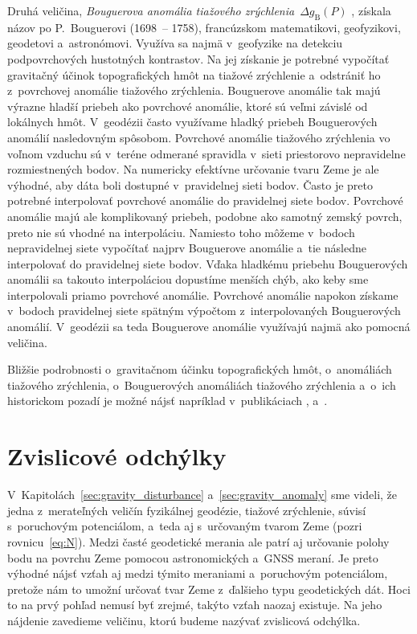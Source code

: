 \documentclass[a4paper, 12pt]{book}
\begin{document}
Druhá veličina, \emph{Bouguerova anomália tiažového zrýchlenia}~$\Delta 
g_{\mathrm{B}}(P)$ \parencite{MoritzPhysicalGeodesy}, získala názov po 
P.~Bouguerovi (1698~-- 1758), francúzskom matematikovi, geofyzikovi, geodetovi 
a~astronómovi.  Využíva sa najmä v~geofyzike na detekciu podpovrchových 
hustotných kontrastov.  Na jej získanie je potrebné vypočítať gravitačný účinok 
topografických hmôt na tiažové zrýchlenie a~odstrániť ho z~povrchovej anomálie 
tiažového zrýchlenia.  Bouguerove anomálie tak majú výrazne hladší priebeh ako 
povrchové anomálie, ktoré sú veľmi závislé od lokálnych hmôt.  V~geodézii často 
využívame hladký priebeh Bouguerových anomálií nasledovným spôsobom.  Povrchové 
anomálie tiažového zrýchlenia vo voľnom vzduchu sú v~teréne odmerané spravidla 
v~sieti priestorovo nepravidelne rozmiestnených bodov.  Na numericky efektívne 
určovanie tvaru Zeme je ale výhodné, aby dáta boli dostupné v~pravidelnej sieti 
bodov.  Často je preto potrebné interpolovať povrchové anomálie do pravidelnej 
siete bodov.  Povrchové anomálie majú ale komplikovaný priebeh, podobne ako 
samotný zemský povrch, preto nie sú vhodné na interpoláciu.  Namiesto toho 
môžeme v~bodoch nepravidelnej siete vypočítať najprv Bouguerove anomálie a~tie 
následne interpolovať do pravidelnej siete bodov.  Vďaka hladkému priebehu 
Bouguerových anomálii sa takouto interpoláciou dopustíme menších chýb, ako keby 
sme interpolovali priamo povrchové anomálie.  Povrchové anomálie napokon 
získame v~bodoch pravidelnej siete spätným výpočtom z~interpolovaných 
Bouguerových anomálií.  V~geodézii sa teda Bouguerove anomálie využívajú najmä 
ako pomocná veličina.

Bližšie podrobnosti o~gravitačnom účinku topografických hmôt, o~anomáliách 
tiažového zrýchlenia, o~Bouguerových anomáliách tiažového zrýchlenia a~o~ich 
historickom pozadí je možné nájsť napríklad v~publikáciach 
\textcite{Meurers2017}, \textcite{Mikuska2017} a~\textcite{Vajda2020}.





\section{Zvislicové odchýlky}
\label{sec:deflections}

V~Kapitolách~\ref{sec:gravity_disturbance} a~\ref{sec:gravity_anomaly} sme 
videli, že jedna z~merateľných veličín fyzikálnej geodézie, tiažové zrýchlenie, 
súvisí s~poruchovým potenciálom, a~teda aj s~určovaným tvarom Zeme (pozri 
rovnicu~\ref{eq:N}).  Medzi časté geodetické merania ale patrí aj určovanie 
polohy bodu na povrchu Zeme pomocou astronomických a~GNSS meraní.  Je preto 
výhodné nájsť vzťah aj medzi týmito meraniami a~poruchovým potenciálom, pretože 
nám to umožní určovať tvar Zeme z~ďalšieho typu geodetických dát.  Hoci to na 
prvý pohľad nemusí byť zrejmé, takýto vzťah naozaj existuje.  Na jeho nájdenie 
zavedieme veličinu, ktorú budeme nazývať zvislicová odchýlka.
\end{document}
